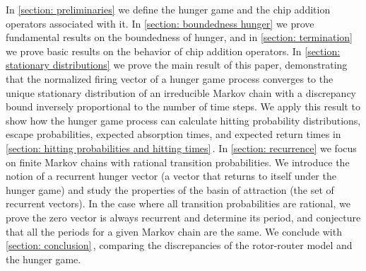 In \cref{section: preliminaries} we define the hunger game
and the chip addition operators associated with it.
In \cref{section: boundedness hunger}
we prove fundamental results on the boundedness of hunger,
and in \cref{section: termination} we prove basic results 
on the behavior of chip addition operators.
In \cref{section: stationary distributions} we prove 
the main result of this paper, demonstrating that 
the normalized firing vector of a hunger game process converges 
to the unique stationary distribution of an irreducible Markov 
chain with a discrepancy bound inversely proportional 
to the number of time steps.
We apply this result to show how the hunger game process 
can calculate hitting probability distributions, escape probabilities, 
expected absorption times, and expected return times 
in \cref{section: hitting probabilities and hitting times}\,.
In \cref{section: recurrence} we focus on finite Markov chains
with rational transition probabilities.
We introduce the notion of a recurrent hunger vector 
(a vector that returns to itself under the hunger game) 
and study the properties of the basin of attraction
(the set of recurrent vectors).
In the case where all transition probabilities are rational,
we prove the zero vector is always recurrent and determine its period, 
and conjecture that all the periods for a given Markov chain are the same.
We conclude with \cref{section: conclusion}\,,
comparing the discrepancies of 
the rotor-router model and the hunger game.

